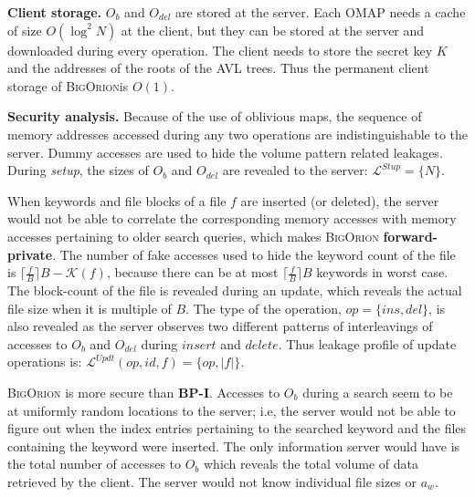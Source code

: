 \documentclass[sigconf]{acmart}
\newcommand{\kw}[1]{\mathcal{K}(#1)}
\newcommand{\vol}[1]{\lvert{#1}\rvert}
\newcommand{\ceil}[1]{\lceil #1 \rceil}
\newcommand{\BigOrion}{\textsc{BigOrion }}
\newcommand{\Bigorion}{\textsc{BigOrion}}
\begin{document}
\noindent\textbf{Client storage.} $O_b$ and $O_{del}$ are stored at the server. Each OMAP needs a cache of size $O(\log^2 N)$ at the client, but they can be stored at the server and downloaded during every operation. The client needs to store the secret key $K$ and the addresses of the roots of the AVL trees. Thus the permanent client storage of \Bigorion is $O(1)$.



\noindent\textbf{Security analysis.}
Because of the use of oblivious maps, the sequence of memory addresses accessed during any two operations are indistinguishable to the server. Dummy accesses are used to hide the volume pattern related leakages. 
During \emph{setup}, the sizes of $O_b$ and $O_{del}$ are revealed to the server: $\mathcal{L}^{Stup} = \{N\}$.


When keywords and file blocks of a file $f$ are inserted (or deleted), the server would not be able to correlate the corresponding memory accesses with memory accesses pertaining to older search queries, which makes \BigOrion \textbf{forward-private}. The number of fake accesses used to hide the keyword count of the file is $\ceil{\frac{f}{B}}B-\kw{f}$, because there can be at most $\ceil{\frac{f}{B}}B$ keywords in worst case. The block-count of the file is revealed during an update, which reveals the actual file size when it is multiple of $B$.
The type of the operation, $op=\{ins,del\}$, is also revealed as the server observes two different patterns of interleavings of accesses to $O_b$ and $O_{del}$ during $insert$ and $delete$. Thus leakage profile of update operations is: $\mathcal{L}^{Updt}(op,id,f) = \{op,\vol{f}\}$. 

\BigOrion is more secure than \textbf{BP-I}. Accesses to $O_b$ during a search seem to be at uniformly random locations to the server; i.e, the server would not be able to figure out when the index entries pertaining to the searched keyword and the files containing the keyword were inserted. The only information server would have is the total number of accesses to $O_b$ which reveals the total volume of data retrieved by the client. The server would not know individual file sizes or $a_w$. 
\end{document}
